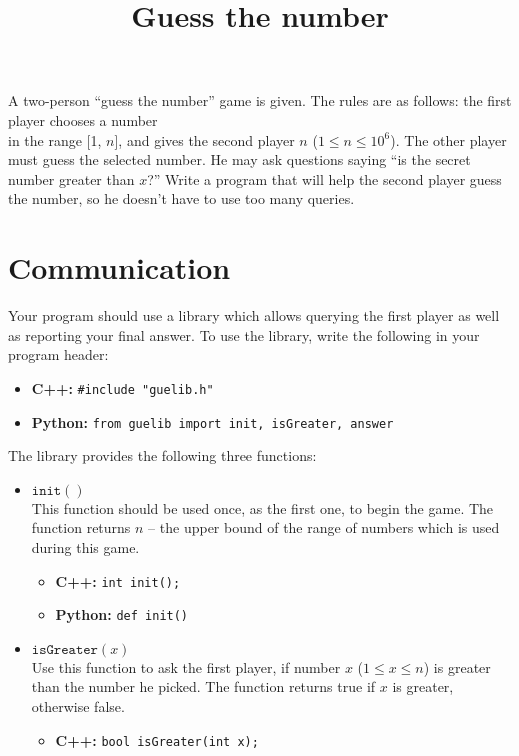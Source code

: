 \documentclass[zad,zawodnik,utf8,en]{sinol}
\title{Guess the number}
\begin{document}
\begin{tasktext}

    \noindent A two-person ``guess the number'' game is given.
    The rules are as follows:
    the first player chooses a number\\in the range [1, $n$],
    and gives the second player $n$ ($1 \leq n \leq 10^6$).
    The other player must guess the selected number. 
    He may ask questions saying ``is the secret number greater than $x$?''
    Write a program that will help the second player guess the number,
    so he doesn't have to use too many queries.

\section{Communication}

    Your program should use a library which allows querying the first player
    as well as reporting your final answer.
    To use the library, write the following in your program header:
    \begin{itemize}
        \item \textbf{C++:}
            \verb|#include "guelib.h"|

        \item \textbf{Python:}
            \texttt{from guelib import init, isGreater, answer}
    \end{itemize}


    \medskip\noindent
    The library provides the following three functions:
    \begin{itemize}
        \item $\texttt{init}()$ \\
            This function should be used once, as the first one, to begin the game.
            The function returns $n$ -- the upper bound of the range of numbers 
            which is used during this game.
            \begin{itemize}
                \item \textbf{C++:}
		                \texttt{int init();}

                \item \textbf{Python:}
		                \texttt{def init()}
            \end{itemize}

        \item $\texttt{isGreater}(x)$ \\
            Use this function to ask the first player,
            if number $x$ ($1 \leq x \leq n$)
            is greater than the number he picked.
            The function returns true if $x$ is greater, otherwise false.
            \begin{itemize}
                \item \textbf{C++:}
		                \texttt{bool isGreater(int x);}


\end{itemize}
\end{itemize}
\end{tasktext}
\end{document}
